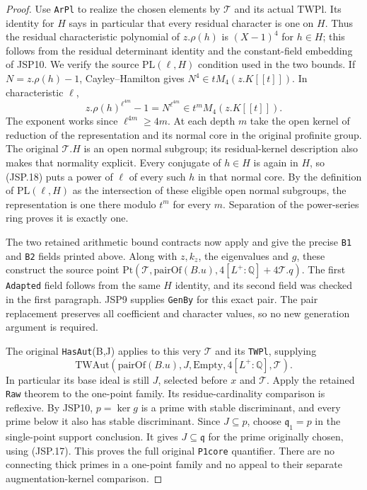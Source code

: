 \begin{proof}
Use \texttt{ArPl} to realize the chosen elements by
$\mathcal T$ and its actual $\mathrm{TWPl}$.
Its identity for $H$ says in particular that every residual
character is one on $H$. Thus the residual characteristic
polynomial of $z.\rho(h)$ is $(X-1)^4$ for $h\in H$;
this follows from the residual determinant identity and the
constant-field embedding of JSP10. We verify the source
$\mathrm{PL}(\ell,H)$ condition used in the two bounds.
If $N=z.\rho(h)-1$, Cayley--Hamilton gives
$N^4\in tM_4(z.K[[t]])$. In characteristic $\ell$,
\[
 z.\rho(h)^{\ell^{4m}}-1=N^{\ell^{4m}}
                                      \in t^mM_4(z.K[[t]]).
 \tag{JSP.18}
\]
The exponent works since $\ell^{4m}\ge4m$.
At each depth $m$ take the open kernel of reduction of the
representation and its normal core in the original profinite
group. The original $\mathcal T.H$ is an open normal subgroup;
its residual-kernel description also makes that normality explicit.
Every conjugate of $h\in H$ is again in $H$, so
(JSP.18) puts a power of $\ell$ of every such $h$ in that
normal core. By the definition of $\mathrm{PL}(\ell,H)$
as the intersection of these eligible open normal subgroups,
the representation is one there modulo $t^m$ for every $m$.
Separation of the power-series ring proves it is exactly one.

The two retained arithmetic bound contracts now apply and
give the precise \texttt{B1} and \texttt{B2} fields printed
above. Along with $z,k_z$, the eigenvalues and $g$, these
construct the source point
$\mathrm{Pt}(\mathcal T,\mathrm{pairOf}(B.u),
4[L^+:\mathbb Q]+4\mathcal T.q)$.
The first \texttt{Adapted} field follows from the same
$H$ identity, and its second field was checked in the first
paragraph. JSP9 supplies \texttt{GenBy} for this exact pair.
The pair replacement preserves all coefficient and character
values, so no new generation argument is required.

The original \texttt{HasAut}(B,J) applies to this very
$\mathcal T$ and its \texttt{TWPl}, supplying
\[
 \mathrm{TWAut}(\mathrm{pairOf}(B.u),J,\mathrm{Empty},
                         4[L^+:\mathbb Q],\mathcal T).
\]
In particular its base ideal
is still $J$, selected before $x$ and $\mathcal T$.
Apply the retained \texttt{Raw} theorem to the one-point
family. Its residue-cardinality comparison is reflexive.
By JSP10, $p=\ker g$ is a prime with stable discriminant,
and every prime below it also has stable discriminant.
Since $J\subseteq p$, choose $\mathfrak q_1=p$ in the
single-point support conclusion. It gives
$J\subseteq\mathfrak q$ for the prime originally chosen,
using (JSP.17). This proves the full original \texttt{P1core}
quantifier. There are no connecting thick primes in a
one-point family and no appeal to their separate
augmentation-kernel comparison.
\end{proof}

